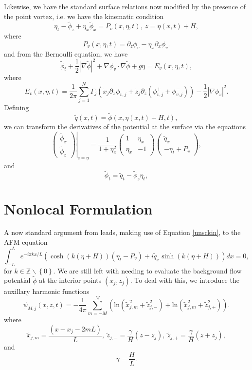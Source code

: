 \documentclass[a4paper,11pt]{article}
\newcommand{\bp}{\begin{pmatrix}}
\newcommand{\ep}{\end{pmatrix}}
\newcommand{\p}{\partial}
\begin{document}
Likewise, we have the standard surface relations now modified by the presence of the point vortex, i.e. we have the kinematic condition 
\begin{equation}
\eta_{t} - \tilde{\phi}_{z} + \eta_{x}\tilde{\phi}_{x} =  P_{v}(x,\eta,t), ~ z =  \eta(x,t)+H,  
\label{unsckin}
\end{equation}
where
\[
P_{v}(x,\eta,t) =   \p_{z}\phi_{v} -  \eta_{x}\p_{x}\phi_{v} .
\]
and from the Bernoulli equation, we have 
\begin{equation}
\tilde{\phi}_{t} + \frac{1}{2 }\left| \nabla \tilde{\phi} \right|^{2} +  \nabla\phi_{v}\cdot \nabla\tilde{\phi} + g\eta = E_{v}(x,\eta,t),
\label{unscbern}
\end{equation}
where
\[
E_{v}(x,\eta,t) = \frac{1}{2\pi}\sum_{j=1}^{N}\Gamma_{j}\left(\dot{x}_{j}\p_{x}\phi_{v,j} + \dot{z}_{j} \p_{z}\left(\phi_{v,j}^{+} + \phi_{v,j}^{-}\right)  \right) - \frac{1}{2}\left| \nabla \phi_{v} \right|^{2}.
\]
Defining 
\[
\tilde{q}(x,t) = \tilde{\phi}(x,\eta(x,t)+H,t),
\]
we can transform the derivatives of the potential at the surface via the equations
\begin{equation}
\left.\bp\tilde{\phi}_{x}\\ \tilde{\phi}_{z}\ep\right|_{z=\eta} = \frac{1}{1+\eta_{x}^{2}}\bp 1 & \eta_{x}\\ \eta_{x} & -1\ep\bp\tilde{q}_{x} \\  -\eta_{t} + P_{v}\ep,
\label{phitrans}
\end{equation}
and
\begin{equation}
\tilde{\phi}_{t} = \tilde{q}_{t}-\tilde{\phi}_{z}\eta_{t},
\label{phittrans}
\end{equation}

\section{Nonlocal Formulation}
A now standard argument from \cite{afm} leads, making use of Equation \eqref{unsckin}, to the AFM equation 
\begin{equation}
\int_{-L}^{L} e^{-i\pi k x/L}\left(\cosh( k(  \eta+H))\left(\eta_{t} - P_{v} \right) + i\tilde{q}_{x}\sinh(k( \eta+H))\right) dx = 0, \label{unscafm}
\end{equation}
for $k \in \mathbb{Z}\backslash\left\{0\right\}$.  We are still left with needing to evaluate the background flow potential $\tilde{\phi}$ at the interior points $(x_{j}, z_{j})$.  To deal with this, we introduce the auxillary harmonic functions 
\[
\psi_{M,j}(x,z,t) = - \frac{1}{4\pi}\sum_{m=-M}^{M} \left( \mbox{ln}\left( \tilde{x}_{j,m}^{2} + \tilde{z}_{j,-}^{2}  \right) + \mbox{ln}\left( \tilde{x}_{j,m}^{2} + \tilde{z}_{j,+}^{2} \right)\right).
\]
where
\[
\tilde{x}_{j,m} = \frac{(x-x_{j}-2mL)}{L}, ~ \tilde{z}_{j,-} = \frac{\gamma}{H}(z-z_{j}), ~ \tilde{z}_{j,+} = \frac{\gamma}{H}(z+z_{j}),
\]
and
\[
\gamma = \frac{H}{L}.
\]
\end{document}
